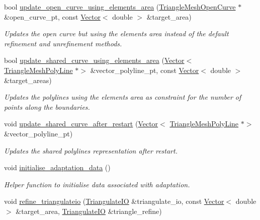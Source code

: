 \begin{DoxyCompactItemize}
bool \hyperlink{classoomph_1_1RefineableTriangleMesh_a75a9af063616474dc96e951b5a3025b9}{update\+\_\+open\+\_\+curve\+\_\+using\+\_\+elements\+\_\+area} (\hyperlink{classoomph_1_1TriangleMeshOpenCurve}{Triangle\+Mesh\+Open\+Curve} $\ast$\&open\+\_\+curve\+\_\+pt, const \hyperlink{classoomph_1_1Vector}{Vector}$<$ double $>$ \&target\+\_\+area)
\begin{DoxyCompactList}\small\item\em Updates the open curve but using the elements area instead of the default refinement and unrefinement methods. \end{DoxyCompactList}\item 
bool \hyperlink{classoomph_1_1RefineableTriangleMesh_abf6df1f560c8559467673c45a5b26e2e}{update\+\_\+shared\+\_\+curve\+\_\+using\+\_\+elements\+\_\+area} (\hyperlink{classoomph_1_1Vector}{Vector}$<$ \hyperlink{classoomph_1_1TriangleMeshPolyLine}{Triangle\+Mesh\+Poly\+Line} $\ast$$>$ \&vector\+\_\+polyline\+\_\+pt, const \hyperlink{classoomph_1_1Vector}{Vector}$<$ double $>$ \&target\+\_\+areas)
\begin{DoxyCompactList}\small\item\em Updates the polylines using the elements area as constraint for the number of points along the boundaries. \end{DoxyCompactList}\item 
void \hyperlink{classoomph_1_1RefineableTriangleMesh_a42bd18f8738951f58bf755085ebb71c2}{update\+\_\+shared\+\_\+curve\+\_\+after\+\_\+restart} (\hyperlink{classoomph_1_1Vector}{Vector}$<$ \hyperlink{classoomph_1_1TriangleMeshPolyLine}{Triangle\+Mesh\+Poly\+Line} $\ast$$>$ \&vector\+\_\+polyline\+\_\+pt)
\begin{DoxyCompactList}\small\item\em Updates the shared polylines representation after restart. \end{DoxyCompactList}\item 
void \hyperlink{classoomph_1_1RefineableTriangleMesh_a1d3d0ec0b197741f6289e24de549f737}{initialise\+\_\+adaptation\+\_\+data} ()
\begin{DoxyCompactList}\small\item\em Helper function to initialise data associated with adaptation. \end{DoxyCompactList}\item 
void \hyperlink{classoomph_1_1RefineableTriangleMesh_aad5cd84d53d6a902a47fda4bcc734e40}{refine\+\_\+triangulateio} (\hyperlink{structoomph_1_1TriangulateIO}{Triangulate\+IO} \&triangulate\+\_\+io, const \hyperlink{classoomph_1_1Vector}{Vector}$<$ double $>$ \&target\+\_\+area, \hyperlink{structoomph_1_1TriangulateIO}{Triangulate\+IO} \&triangle\+\_\+refine)

\end{DoxyCompactItemize}
